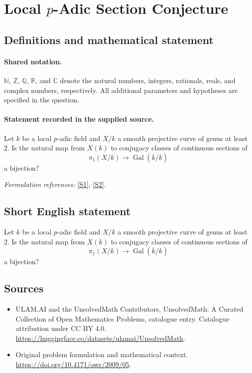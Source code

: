 \documentclass[11pt]{article}
\newcommand{\sref}[2]{\hyperlink{source:#1:#2}{[S#2]}}
\begin{document}
\section{\texorpdfstring{Local $p$-Adic Section Conjecture}{Local p-Adic Section Conjecture}}\label{statement}

\subsection{Definitions and mathematical statement}

\paragraph{Shared notation.}$\mathbb N$, $\mathbb Z$, $\mathbb Q$, $\mathbb R$, and $\mathbb C$ denote the natural numbers, integers, rationals, reals, and complex numbers, respectively. All additional parameters and hypotheses are specified in the question.


\paragraph{Statement recorded in the supplied source.}
Let $k$ be a local $p$-adic field and $X/k$ a smooth projective curve of genus at least $2$. Is the natural map from $X(k)$ to conjugacy classes of continuous sections of $$\pi_1(X/k)\longrightarrow\operatorname{Gal}(\overline k/k)$$ a bijection?
\par\smallskip\textit{Formulation references:} \sref{statement}{1}, \sref{statement}{2}.
\subsection{Short English statement}
Let $k$ be a local $p$-adic field and $X/k$ a smooth projective curve of genus at least $2$. Is the natural map from $X(k)$ to conjugacy classes of continuous sections of $$\pi_1(X/k)\longrightarrow\operatorname{Gal}(\overline k/k)$$ a bijection?
\subsection{Sources}
\begin{itemize}
\item[\hypertarget{source:statement:1}{S1}] ULAM.AI and the UnsolvedMath Contributors, UnsolvedMath: A Curated Collection of Open Mathematics Problems, catalogue entry. Catalogue attribution under CC BY 4.0.
\url{https://huggingface.co/datasets/ulamai/UnsolvedMath}.
\item[\hypertarget{source:statement:2}{S2}] Original problem formulation and mathematical context.
\url{https://doi.org/10.4171/owr/2009/05}.
\end{itemize}
\label{end:statement}
\end{document}
